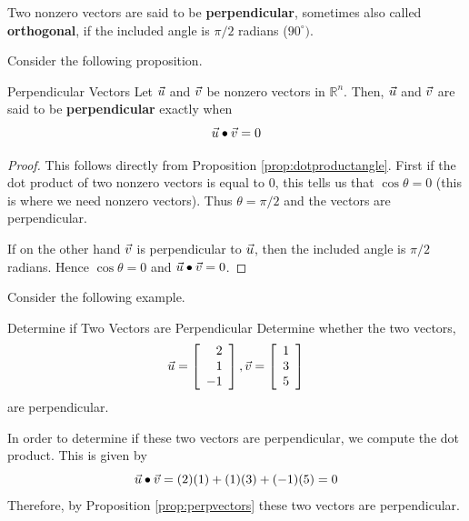 Two nonzero  vectors are said to be \textbf{perpendicular},
 sometimes also called \textbf{orthogonal}, if
the included angle is $\pi /2$ radians ($90^{\circ }).$

Consider the following proposition.

\begin{proposition}{Perpendicular Vectors}\label{prop:perpvectors}
Let $\vec{u}$ and $\vec{v}$ be nonzero vectors in $\mathbb{R}^n$. Then, 
$\vec{u}$ and $\vec{v}$ are said to be \textbf{perpendicular}  exactly when
\begin{equation*}
\vec{u}
\bullet
\vec{v}
=
0
\end{equation*}
\end{proposition}

\ifdefined\showproofs
\begin{proof}
This follows directly from Proposition \ref{prop:dotproductangle}. First if the dot product of
two nonzero vectors is equal to $0$, this tells us that $\cos \theta
=0$ (this is where we need nonzero vectors). Thus $\theta = \pi /2$
and the vectors are perpendicular.

If on the other hand $\vec{v}$ is perpendicular to $\vec{u}$, then 
the included angle is $\pi /2$ radians. Hence $\cos \theta =0$ and 
$\vec{u} \bullet \vec{v} = 0$.
\end{proof}
\fi
Consider the following example.

\begin{example}{Determine if Two Vectors are Perpendicular}\label{exa:perpendicularvectors}
Determine whether the two vectors, 
\begin{equation*}
\vec{u}=
\left[
\begin{array}{r}
2 \\
1 \\
-1 
\end{array}
\right], 
\vec{v} 
=
\left[
\begin{array}{r}
1 \\
3 \\
5
\end{array}
\right]
\end{equation*}
 are perpendicular.
\end{example}

\begin{solution}
In order to determine if these two vectors are perpendicular, we compute the dot product.
This is given by
\begin{equation*}
\vec{u} \bullet \vec{v}
=
(2)(1) + (1)(3) + (-1)(5)
=
0
\end{equation*}
Therefore, by Proposition \ref{prop:perpvectors} these two vectors are perpendicular.
\end{solution}